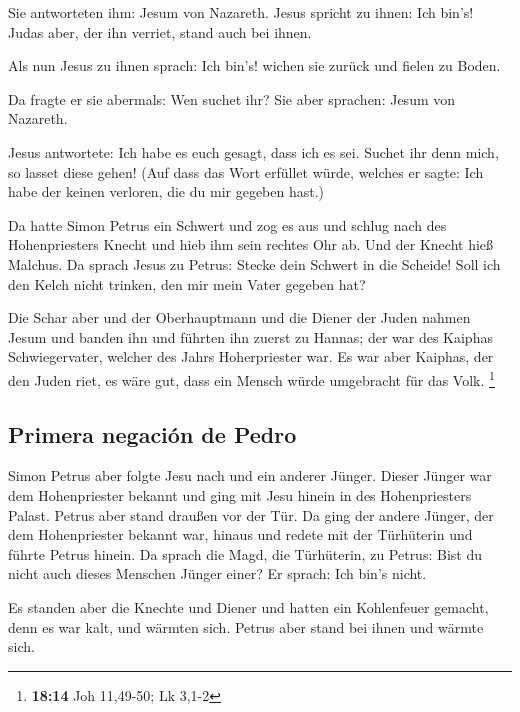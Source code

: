  Sie antworteten ihm: Jesum von Nazareth. Jesus spricht zu
ihnen: Ich bin's! Judas aber, der ihn verriet, stand auch bei ihnen.

 Als nun Jesus zu ihnen sprach: Ich bin's! wichen sie
zurück und fielen zu Boden.

 Da fragte er sie abermals: Wen suchet ihr? Sie aber
sprachen: Jesum von Nazareth.

 Jesus antwortete: Ich habe es euch gesagt, dass ich es
sei. Suchet ihr denn mich, so lasset diese gehen!  (Auf
dass das Wort erfüllet würde, welches er sagte: Ich habe der keinen
verloren, die du mir gegeben hast.)

 Da hatte Simon Petrus ein Schwert und zog es aus und
schlug nach des Hohenpriesters Knecht und hieb ihm sein rechtes Ohr ab.
Und der Knecht hieß Malchus.  Da sprach Jesus zu Petrus:
Stecke dein Schwert in die Scheide! Soll ich den Kelch nicht trinken,
den mir mein Vater gegeben hat?

 Die Schar aber und der Oberhauptmann und die Diener der
Juden nahmen Jesum und banden ihn  und führten ihn zuerst
zu Hannas; der war des Kaiphas Schwiegervater, welcher des Jahrs
Hoherpriester war.  Es war aber Kaiphas, der den Juden
riet, es wäre gut, dass ein Mensch würde umgebracht für das Volk.
\footnote{\textbf{18:14} Joh 11,49-50; Lk 3,1-2}

\hypertarget{primera-negaciuxf3n-de-pedro}{%
\subsection{Primera negación de
Pedro}\label{primera-negaciuxf3n-de-pedro}}

 Simon Petrus aber folgte Jesu nach und ein anderer
Jünger. Dieser Jünger war dem Hohenpriester bekannt und ging mit Jesu
hinein in des Hohenpriesters Palast.  Petrus aber stand
draußen vor der Tür. Da ging der andere Jünger, der dem Hohenpriester
bekannt war, hinaus und redete mit der Türhüterin und führte Petrus
hinein.  Da sprach die Magd, die Türhüterin, zu Petrus:
Bist du nicht auch dieses Menschen Jünger einer? Er sprach: Ich bin's
nicht.

 Es standen aber die Knechte und Diener und hatten ein
Kohlenfeuer gemacht, denn es war kalt, und wärmten sich. Petrus aber
stand bei ihnen und wärmte sich.

